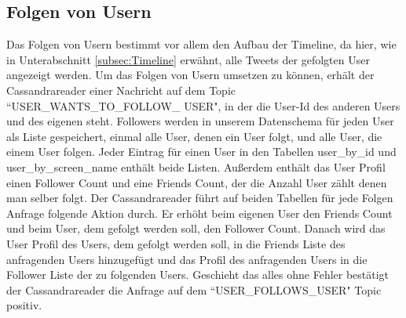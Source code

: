 \subsection{Folgen von Usern}
Das Folgen von Usern bestimmt vor allem den Aufbau der Timeline, da hier, wie in Unterabschnitt \ref{subsec:Timeline} erwähnt, alle Tweets der gefolgten User angezeigt werden. Um das Folgen von Usern umsetzen zu können, erhält der Cassandrareader einer Nachricht auf dem Topic ``USER\_WANTS\_TO\_FOLLOW\_ USER", in der die User-Id des anderen Users und des eigenen steht. Followers werden in unserem Datenschema für jeden User als Liste gespeichert, einmal alle User, denen ein User folgt, und alle User, die einem User folgen. Jeder Eintrag für einen User in den Tabellen user\_by\_id und user\_by\_screen\_name enthält beide Listen. Außerdem enthält das User Profil einen Follower Count und eine Friends Count, der die Anzahl User zählt denen man selber folgt. Der Cassandrareader führt auf beiden Tabellen für jede Folgen Anfrage folgende Aktion durch. Er erhöht beim eigenen User den Friends Count und beim User, dem gefolgt werden soll, den Follower Count. Danach wird das User Profil des Users, dem gefolgt werden soll, in die Friends Liste des anfragenden Users hinzugefügt und das Profil des anfragenden Users in die Follower Liste der zu folgenden Users. Geschieht das alles ohne Fehler bestätigt der Cassandrareader die Anfrage auf dem ``USER\_FOLLOWS\_USER" Topic positiv.
